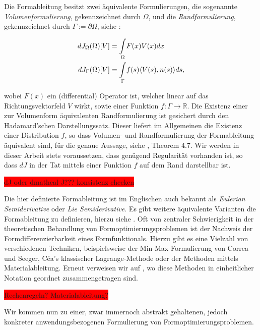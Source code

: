 Die Formableitung besitzt zwei äquivalente Formulierungen, die sogenannte \textit{Volumenformulierung}, gekennzeichnet durch $\Omega$, und die \textit{Randformulierung}, gekennzeichnet durch $\Gamma := \partial \Omega$, siehe \cite{bfgs2}:

\begin{align*}
	dJ_\Omega(\Omega)[V] &= \underset{\Omega}{\int}F(x)V(x)dx\\
	\vspace{0.5cm}
	dJ_\Gamma(\Omega)[V] &= \underset{\Gamma}{\int}f(s)\langle V(s),n(s)\rangle ds,
\end{align*}

wobei $F(x)$ ein (differential) Operator ist, welcher linear auf das Richtungsvektorfeld $V$ wirkt, sowie einer Funktion $f: \Gamma \rightarrow \mathbb{R}$. Die Existenz einer zur Volumenform äquivalenten Randformulierung ist gesichert durch den Hadamard'schen Darstellungssatz. Dieser liefert im Allgemeinen die Existenz einer Distribution $f$, so dass Volumen- und Randformulierung der  Formableitung äquivalent sind, für die genaue Aussage, siehe \cite{shape_space}, Theorem 4.7. Wir werden in dieser Arbeit stets voraussetzen, dass genügend Regularität vorhanden ist, so dass $dJ$ in der Tat mittels einer Funktion $f$ auf dem Rand darstellbar ist.

\colorbox{red}{ dJ oder dmathcal J??? konsistenz checken}

Die hier definierte Formableitung ist im Englischen auch bekannt als \textit{Eulerian Semiderivative} oder \textit{Lie Semiderivative}. Es gibt weitere äquivalente Varianten die Formableitung zu definieren, hierzu siehe \cite{Shape_diff}. Oft von zentraler Schwierigkeit in der theoretischen Behandlung von Formoptimierungsproblemen ist der Nachweis der Formdifferenzierbarkeit eines Formfunktionals. Hierzu gibt es eine Vielzahl von verschiedenen Techniken, beispielsweise der Min-Max Formulierung von Correa und Seeger, Céa's klassischer Lagrange-Methode oder der Methoden mittels Materialableitung. Erneut verweisen wir auf \cite{Shape_diff}, wo diese Methoden in einheitlicher Notation geordnet zusammengetragen sind.

\colorbox{red}{Rechenregeln? Materialableitung?}

Wir kommen nun zu einer, zwar immernoch abstrakt gehaltenen, jedoch konkreter anwendungsbezogenen Formulierung von Formoptimierungsproblemen.

